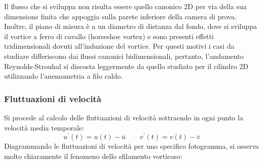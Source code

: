 \noindent Il flusso che si sviluppa non risulta essere quello canonico 2D per via della sua dimensione finita che appoggia sulla parete inferiore della camera di prova. Inoltre, il piano di misura è a un diametro di distanza dal fondo, dove si sviluppa il vortice a ferro di cavallo (horseshoe vortex) e sono presenti effetti tridimensionali dovuti all'induzione del vortice. Per questi motivi i casi da studiare differiscono dai flussi canonici bidimensionali, pertanto, l'andamento Reynolds-Strouhal si discosta leggermente da quello studiato per il cilindro 2D utilizzando l'anemometria a filo caldo.

\newpage
\subsubsection{Fluttuazioni di velocità}
Si procede al calcolo delle fluttuazioni di velocità sottraendo in ogni punto la velocità media temporale:
\begin{equation*}
    u^\prime(t) = u(t) - \overline u \qquad v^\prime(t) = v(t) - \overline v  
\end{equation*}
Diagrammando le fluttuazioni di velocità per uno specifico fotogramma, si osserva molto chiaramente il fenomeno dello sfilamento vorticoso:

